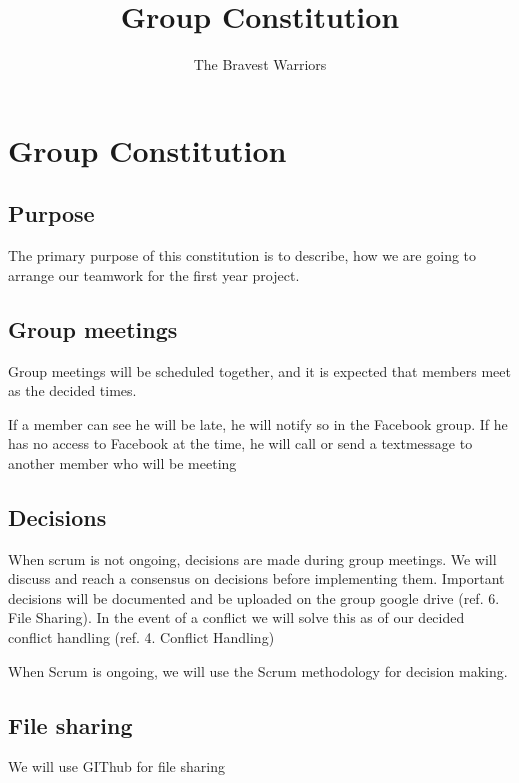 \documentclass[]{report}
\title{Group Constitution}
\author{The Bravest Warriors}
\begin{document}
\maketitle


\chapter{Group Constitution}

\section{Purpose}
The primary purpose of this constitution is to describe, how we are going to arrange our teamwork for the first year project.

\section{Group meetings}
Group meetings will be scheduled together, and it is expected that members meet as the decided times.

If a member can see he will be late, he will notify so in the Facebook group. If he has no access to Facebook at the time, he will call or send a textmessage to another member who will be meeting

\section{Decisions}
When scrum is not ongoing, decisions are made during group meetings. We will discuss and reach a consensus on decisions before implementing them. Important decisions will be documented and be uploaded on the group google drive (ref. 6. File Sharing). In the event of a conflict we will solve this as of our decided conflict handling (ref. 4. Conflict Handling)


When Scrum is ongoing, we will use the Scrum methodology for decision making.


\section{File sharing}
We will use GIThub for file sharing
\end{document}
